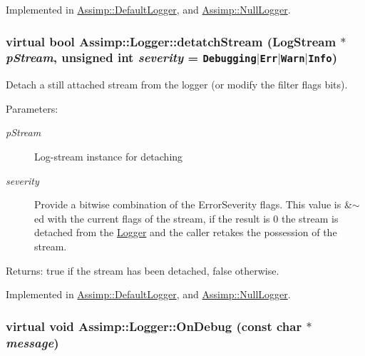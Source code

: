 Implemented in \hyperlink{class_assimp_1_1_default_logger_bc0ca7a337f8c3e38eca0eb45bb1ccf0}{Assimp::DefaultLogger}, and \hyperlink{class_assimp_1_1_null_logger_31c05ecaee392b5fd34fd2dfd1cca559}{Assimp::NullLogger}.\hypertarget{class_assimp_1_1_logger_9489263727f29fecbd705d5c8d2590c0}{
\subsubsection[detatchStream]{\setlength{\rightskip}{0pt plus 5cm}virtual bool Assimp::Logger::detatchStream ({\bf LogStream} $\ast$ {\em pStream}, \/  unsigned int {\em severity} = {\tt Debugging$|$Err$|$Warn$|$Info})}}
\label{class_assimp_1_1_logger_9489263727f29fecbd705d5c8d2590c0}


Detach a still attached stream from the logger (or modify the filter flags bits). 

\begin{Desc}
\item[Parameters:]
\begin{description}
\item[{\em pStream}]Log-stream instance for detaching \item[{\em severity}]Provide a bitwise combination of the ErrorSeverity flags. This value is \&$\sim$ed with the current flags of the stream, if the result is 0 the stream is detached from the \hyperlink{class_assimp_1_1_logger}{Logger} and the caller retakes the possession of the stream. \end{description}
\end{Desc}
\begin{Desc}
\item[Returns:]true if the stream has been detached, false otherwise. \end{Desc}


Implemented in \hyperlink{class_assimp_1_1_default_logger_2615f1d1624f1d742d0cf2dd4a5cccc8}{Assimp::DefaultLogger}, and \hyperlink{class_assimp_1_1_null_logger_b49b14a0045aab73b813a448b5aa77b4}{Assimp::NullLogger}.\hypertarget{class_assimp_1_1_logger_ded6996d20f14204877097b88bd5eac6}{
\subsubsection[OnDebug]{\setlength{\rightskip}{0pt plus 5cm}virtual void Assimp::Logger::OnDebug (const char $\ast$ {\em message})}}
\label{class_assimp_1_1_logger_ded6996d20f14204877097b88bd5eac6}


